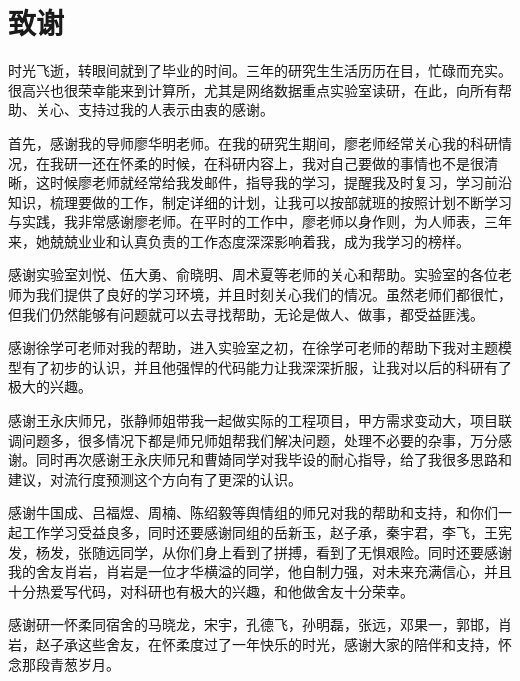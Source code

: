 \chapter[致谢]{致\quad 谢}%

时光飞逝，转眼间就到了毕业的时间。三年的研究生生活历历在目，忙碌而充实。很高兴也很荣幸能来到计算所，尤其是网络数据重点实验室读研，在此，向所有帮助、关心、支持过我的人表示由衷的感谢。

首先，感谢我的导师廖华明老师。在我的研究生期间，廖老师经常关心我的科研情况，在我研一还在怀柔的时候，在科研内容上，我对自己要做的事情也不是很清晰，这时候廖老师就经常给我发邮件，指导我的学习，提醒我及时复习，学习前沿知识，梳理要做的工作，制定详细的计划，让我可以按部就班的按照计划不断学习与实践，我非常感谢廖老师。在平时的工作中，廖老师以身作则，为人师表，三年来，她兢兢业业和认真负责的工作态度深深影响着我，成为我学习的榜样。

感谢实验室刘悦、伍大勇、俞晓明、周术夏等老师的关心和帮助。实验室的各位老师为我们提供了良好的学习环境，并且时刻关心我们的情况。虽然老师们都很忙，但我们仍然能够有问题就可以去寻找帮助，无论是做人、做事，都受益匪浅。

感谢徐学可老师对我的帮助，进入实验室之初，在徐学可老师的帮助下我对主题模型有了初步的认识，并且他强悍的代码能力让我深深折服，让我对以后的科研有了极大的兴趣。

感谢王永庆师兄，张静师姐带我一起做实际的工程项目，甲方需求变动大，项目联调问题多，很多情况下都是师兄师姐帮我们解决问题，处理不必要的杂事，万分感谢。同时再次感谢王永庆师兄和曹婍同学对我毕设的耐心指导，给了我很多思路和建议，对流行度预测这个方向有了更深的认识。

感谢牛国成、吕福煜、周楠、陈绍毅等舆情组的师兄对我的帮助和支持，和你们一起工作学习受益良多，同时还要感谢同组的岳新玉，赵子承，秦宇君，李飞，王宪发，杨发，张随远同学，从你们身上看到了拼搏，看到了无惧艰险。同时还要感谢我的舍友肖岩，肖岩是一位才华横溢的同学，他自制力强，对未来充满信心，并且十分热爱写代码，对科研也有极大的兴趣，和他做舍友十分荣幸。

感谢研一怀柔同宿舍的马晓龙，宋宇，孔德飞，孙明磊，张远，邓果一，郭邯，肖岩，赵子承这些舍友，在怀柔度过了一年快乐的时光，感谢大家的陪伴和支持，怀念那段青葱岁月。

